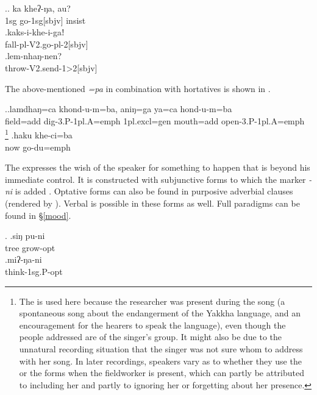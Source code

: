 \ex.\ag. ka kheʔ-ŋa, au?\\
  {\sc 1sg} go{\sc -1sg[sbjv]} {\sc insist}\\
  \bg.kaks-i-khe-i-gaǃ\\
  fall{\sc -pl-V2.go-pl-2[sbjv]}\\
  \bg.lem-nhaŋ-nen?\\
  throw{\sc -V2.send-1>2[sbjv]}\\
  
The above-mentioned  \emph{=pa} in combination with hortatives is shown in \Next.
  
  \ex.\ag.lamdhaŋ=ca        khond-u-m=ba, aniŋ=ga ya=ca           hond-u-m=ba\\
 field{\sc =add} dig{\sc -3.P-1pl.A=emph} {\sc 1pl.excl=gen} mouth{\sc =add} open{\sc -3.P-1pl.A=emph}\\
 \footnote{The  is used here because the researcher was present during the song (a spontaneous song about the endangerment of the Yakkha language, and an encouragement for the hearers to speak the language), even though the people addressed are of the singer's group. It might also be due to the unnatural recording situation that the singer was not sure whom to address with her song. In later recordings, speakers vary as to whether they use the  or the  forms when the fieldworker is present, which can partly be attributed to including her and partly to ignoring her or forgetting about her presence.}  
  \bg.haku khe-ci=ba\\
  now go{\sc -du=emph}\\
  
  
  The  expresses the wish of the speaker for something to happen that is beyond his immediate control. It is constructed with subjunctive forms to which the marker \emph{-ni}  is added \Next. Optative forms can also be found in purposive adverbial clauses (rendered by ). Verbal  is possible in these forms as well. Full paradigms can be found in §\ref{mood}.
  
  \ex. \ag.siŋ pu-ni\\
  tree grow{\sc [3sg]-opt}\\
  \bg.miʔ-ŋa-ni\\
  think{\sc -1sg.P-opt}\\
 
